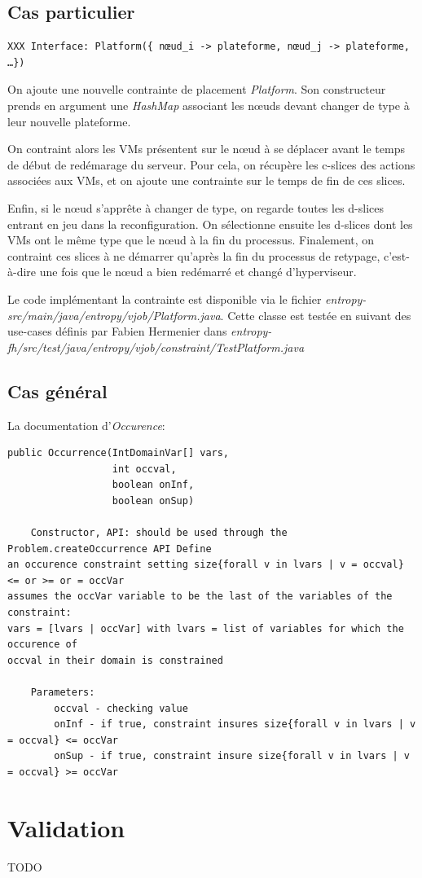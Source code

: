 \documentclass[a4paper]{article}
\begin{document}
\subsection{Cas particulier}
\begin{verbatim}
XXX Interface: Platform({ nœud_i -> plateforme, nœud_j -> plateforme, …})
\end{verbatim}

On ajoute une nouvelle contrainte de placement \textit{Platform}. Son
constructeur prends en argument une \textit{HashMap} associant les
nœuds devant changer de type à leur nouvelle plateforme.

On contraint alors les VMs présentent sur le nœud à se déplacer
avant le temps de début de redémarage du serveur. Pour cela, on
récupère les c-slices des actions associées aux VMs, et on ajoute
une contrainte sur le temps de fin de ces slices.

Enfin, si le nœud s'apprête à changer de type, on regarde toutes
les d-slices entrant en jeu dans la reconfiguration. On sélectionne
ensuite les d-slices dont les VMs ont le même type que le nœud à la fin
du processus. Finalement, on contraint ces slices à ne démarrer
qu'après la fin du processus de retypage, c'est-à-dire une fois que
le nœud a bien redémarré et changé d'hyperviseur.

Le code implémentant la contrainte est disponible via le fichier
\textit{entropy-src/main/java/entropy/vjob/Platform.java}. Cette
classe est testée en suivant des use-cases définis par Fabien Hermenier dans
\textit{entropy-fh/src/test/java/entropy/vjob/constraint/TestPlatform.java}

\subsection{Cas général}
La documentation d'\textit{Occurence}:
\begin{verbatim}
public Occurrence(IntDomainVar[] vars,
                  int occval,
                  boolean onInf,
                  boolean onSup)

    Constructor, API: should be used through the Problem.createOccurrence API Define
an occurence constraint setting size{forall v in lvars | v = occval} <= or >= or = occVar
assumes the occVar variable to be the last of the variables of the constraint:
vars = [lvars | occVar] with lvars = list of variables for which the occurence of
occval in their domain is constrained

    Parameters:
        occval - checking value
        onInf - if true, constraint insures size{forall v in lvars | v = occval} <= occVar
        onSup - if true, constraint insure size{forall v in lvars | v = occval} >= occVar

\end{verbatim}

\section{Validation}
TODO

\newpage
{}


\end{document}
